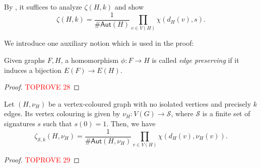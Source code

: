 \documentclass[authorcolumns,numberwithinsect]{no-lipics-v2022}
\begin{document}
By , it suffices to analyze $\zeta(H, k)$ and show
\[\zeta(H, k) = \frac1{\#\mathsf{Aut}(H)}\prod_{v \in V(H)}\chi(d_H(v), s).\]

We introduce one auxiliary notion which is used in the proof:
\begin{definition}
Given graphs $F,H$, a homomorphism $\phi : F \to H$ is called \emph{edge preserving} if it induces a bijection $E(F) \to E(H)$. 
\end{definition}

\begin{proof}\textcolor{red}{TOPROVE 28}\end{proof}

\begin{theorem}\label{thm:k_edges_multiple_signatures}
Let $(H, \nu_H)$ be a vertex-coloured graph with no isolated vertices and precisely $k$ edges. Its vertex colouring is given by $\nu_H : V(G) \to \mathcal{S}$, where $\mathcal{S}$ is a finite set of signatures $s$ such that $s(0) = 1$. Then, we have
\[\zeta_{\mathcal{S}, k}(H, \nu_H) = \frac1{\#\mathsf{Aut}(H, \nu_H)}\prod_{v\in V(H)}\chi(d_H(v), \nu_H(v)).\]
\end{theorem}

\begin{proof}\textcolor{red}{TOPROVE 29}\end{proof}
\end{document}
